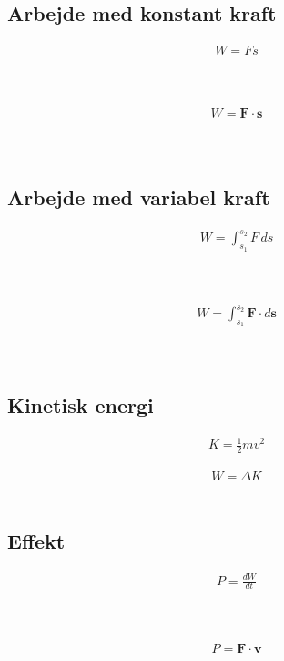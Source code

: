 \subsection{Arbejde med konstant kraft}
	\begin{align}
		W=Fs
	\end{align}
	\arbejde\\
	\kraft\\
	\strek

	\begin{align}
		W=\mathbf{F}\cdot\mathbf{s}
	\end{align}
	\arbejde\\
	\Kraft\\
	\Strek

\subsection{Arbejde med variabel kraft}
	\begin{align}
		W=\int_{s_1}^{s_2}F\,ds
	\end{align}
	\arbejde\\
	\kraft\\
	\strek

	\begin{align}
		W=\int_{s_1}^{s_2}\mathbf{F}\cdot d\mathbf{s}
	\end{align}
	\arbejde\\
	\Kraft\\
	\Strek

\subsection{Kinetisk energi}
	\begin{align}
		K=\frac{1}{2}mv^2
	\end{align}
	\kinenergi
	\masse
	\vel

	\begin{align}
		W=\Delta K
	\end{align}
	\arbejde\\
	\kinenergi

\subsection{Effekt}
	\begin{align}
		P=\frac{dW}{dt}
	\end{align}
	\effekt\\
	\arbejde\\
	\tid

	\begin{align}
		P=\mathbf{F}\cdot\mathbf{v}
	\end{align}
	\effekt\\
	\Kraft\\
	\Vel